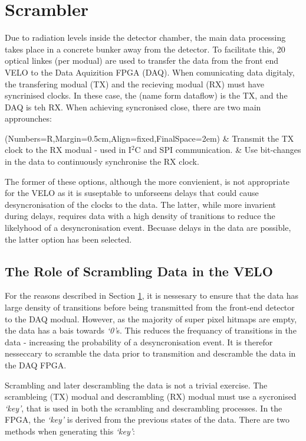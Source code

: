 \section{Scrambler}
\label{sec:scrambling_algorithms}

	Due to radiation levels inside the detector chamber, the main data processing takes place in a concrete bunker away from the detector.
	To facilitate this, 20 optical linkes (per modual) are used to transfer the data from the front end VELO to the Data Aquizition FPGA (DAQ).
	When comunicating data digitaly, the transfering modual (TX) and the recieving modual (RX) must have syncrinised clocks.
	In these case, the (name form dataflow) is the TX, and the DAQ is teh RX.
	When achieving syncronised close, there are two main approunches:

	\begin{easylist}
		\ListProperties(Numbers=R,Margin=0.5cm,Align=fixed,FinalSpace=2em)
		& Transmit the TX clock to the RX modual - used in I$^2$C and SPI communication.
		& Use bit-changes in the data to continuously synchronise the RX clock.
	\end{easylist}

	The former of these options, although the more convienient, is not appropriate for the VELO as it is suseptable to unforseens delays that could cause desyncronisation of the clocks to the data.
	The latter, while more invarient during delays, requires data with a high density of tranitions to reduce the likelyhood of a desyncronisation event.
	Becuase delays in the data are possible, the latter option has been selected.

	\subsection{The Role of Scrambling Data in the VELO}
		
		For the reasons described in Section \ref{sec:scrambling_algorithms}, it is nessesary to ensure that the data has large density of transitions before being transmitted from the front-end detector to the DAQ modual.
		However, as the majority of super pixel hitmaps are empty, the data has a bais towards \textit{`0'}s.
		This reduces the frequancy of transitions in the data - increasing the probability of a desyncronisation event.
		It is therefor nesseccary to scramble the data prior to transmition and descramble the data in the DAQ FPGA.
		\par
		Scrambling and later descrambling the data is not a trivial exercise.
		The scrambleing (TX) modual and descrambling (RX) modual must use a sycronised \textit{`key'}, that is used in both the scrambling and descrambling processes.
		In the FPGA, the \textit{`key'} is derived from the previous states of the data.
		There are two methods when generating this \textit{`key'}:


